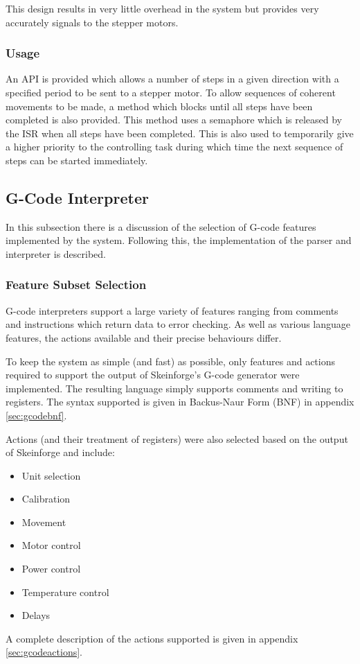 				This design results in very little overhead in the system but provides
				very accurately signals to the stepper motors.
			
			\subsubsection{Usage}
				
				An API is provided which allows a number of steps in a given direction
				with a specified period to be sent to a stepper motor. To allow
				sequences of coherent movements to be made, a method which blocks until
				all steps have been completed is also provided. This method uses a
				semaphore which is released by the ISR when all steps have been
				completed. This is also used to temporarily give a higher priority to
				the controlling task during which time the next sequence of steps
				can be started immediately.
		
		\subsection{G-Code Interpreter}
			
			In this subsection there is a discussion of the selection of G-code
			features implemented by the system. Following this, the implementation of
			the parser and interpreter is described.
			
			\subsubsection{Feature Subset Selection}
				
				G-code interpreters support a large variety of features ranging from
				comments and instructions which return data to error checking. As well
				as various language features, the actions available and their precise
				behaviours differ.
				
				To keep the system as simple (and fast) as possible, only features and
				actions required to support the output of Skeinforge's G-code generator
				were implemented.  The resulting language simply supports comments and
				writing to registers.  The syntax supported is given in Backus-Naur Form
				(BNF) in appendix \ref{sec:gcodebnf}.
				
				Actions (and their treatment of registers) were also selected based on the
				output of Skeinforge and include:
				\begin{itemize}
					\item Unit selection
					\item Calibration
					\item Movement
					\item Motor control
					\item Power control
					\item Temperature control
					\item Delays
				\end{itemize}
				A complete description of the actions supported is given in appendix
				\ref{sec:gcodeactions}.
			
